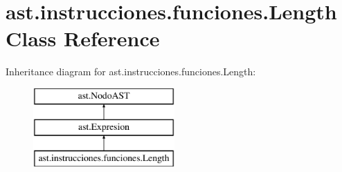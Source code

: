 \hypertarget{classast_1_1instrucciones_1_1funciones_1_1_length}{}\section{ast.\+instrucciones.\+funciones.\+Length Class Reference}
\label{classast_1_1instrucciones_1_1funciones_1_1_length}
Inheritance diagram for ast.\+instrucciones.\+funciones.\+Length\+:\begin{figure}[H]
\begin{center}
\leavevmode
\includegraphics[height=3.000000cm]{classast_1_1instrucciones_1_1funciones_1_1_length}
\end{center}
\end{figure}
